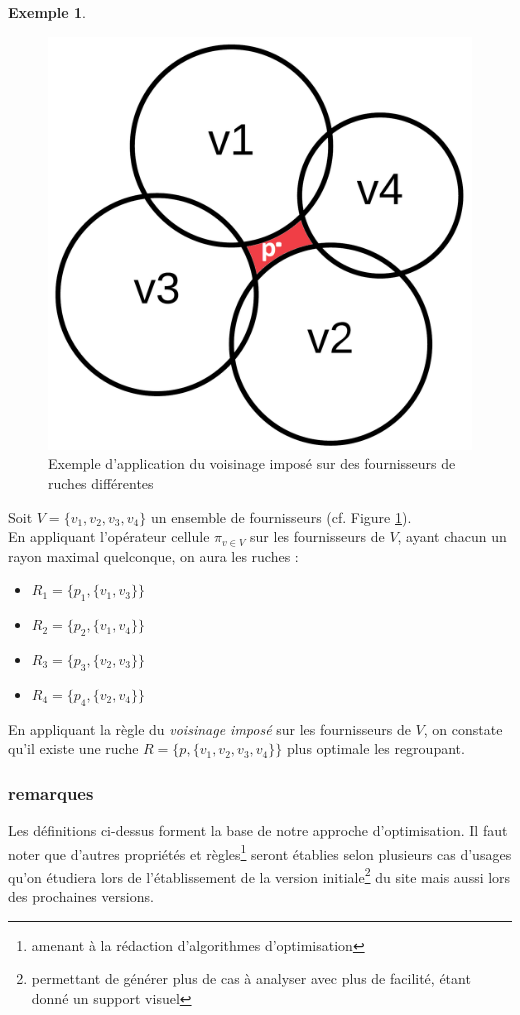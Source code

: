 \documentclass[a4paper,12pt]{report}
\theoremstyle{break}
\theoremstyle{break}
\theoremstyle{break}
\theoremstyle{break}
\theoremstyle{definition}
\newtheorem*{example}{Exemple}
\theoremstyle{remark}
\begin{document}
\begin{example}
\begin{figure}
  \centering
  \includegraphics[scale=0.15]{images/exemple_introductif2.png}
  \caption{Exemple d'application du voisinage imposé sur des fournisseurs de ruches différentes}
  \label{fig:exemple_introductif_2}
\end{figure}

Soit $V = \{v_1, v_2, v_3, v_4\}$ un ensemble de fournisseurs (cf. Figure \ref{fig:exemple_introductif_2}).\\
En appliquant l'opérateur cellule $\pi_{v \in V}$ sur les fournisseurs de $V$, ayant chacun un rayon maximal quelconque, on aura les ruches :
\begin{itemize}
  \item{$R_1 = \{p_1, \{v_1, v_3\}\}$}
  \item{$R_2 = \{p_2, \{v_1, v_4\}\}$}
  \item{$R_3 = \{p_3, \{v_2, v_3\}\}$}
  \item{$R_4 = \{p_4, \{v_2, v_4\}\}$}
\end{itemize}
En appliquant la règle du \textit{voisinage imposé} sur les fournisseurs de $V$, on constate qu'il existe une ruche $R=\{p, \{v_1, v_2, v_3, v_4\}\}$ plus optimale les regroupant.
\end{example}

\subsubsection{remarques}
Les définitions ci-dessus forment la base de notre approche d'optimisation. Il faut noter que d'autres propriétés et règles\footnote{amenant à la rédaction d'algorithmes d'optimisation} seront établies selon plusieurs cas d'usages qu'on étudiera lors de l'établissement de la version initiale\footnote{permettant de générer plus de cas à analyser avec plus de facilité, étant donné un support visuel} du site mais aussi lors des prochaines versions.
\end{document}
